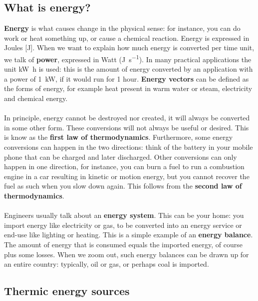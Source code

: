 \documentclass[../summary.tex]{subfiles}
\begin{document}
\subsection{What is energy?}

\textbf{Energy} is what causes change in the physical sense: for instance, you can do work or heat something up, or cause a chemical reaction. Energy is expressed in Joules [\unit{\joule}]. When we want to explain how much energy is converted per time unit, we talk of \textbf{power}, expressed in Watt (\unit{\joule\per\second}). In many practical applications the unit \unit{\kilo\watt\hour} is used: this is the amount of energy converted by an application with a power of \SI{1}{\kilo\watt}, if it would run for 1 hour. \textbf{Energy vectors} can be defined as the forms of energy, for example heat present in warm water or steam, electricity and chemical energy.
\\\\
In principle, energy cannot be destroyed nor created, it will always be converted in some other form. These conversions will not always be useful or desired. This is know as the \textbf{first law of thermodynamics}. Furthermore, some energy conversions can happen in the two directions: think of the battery in your mobile phone that can be charged and later discharged. Other conversions can only happen in one direction, for instance, you can burn a fuel to run a combustion engine in a car resulting in kinetic or motion energy, but you cannot recover the fuel as such when you slow down again. This follows from the \textbf{second law of thermodynamics}.
\\\\
Engineers usually talk about an \textbf{energy system}. This can be your home: you import energy like electricity or gas, to be converted into an energy service or end-use like lighting or heating. This is a simple example of an \textbf{energy balance}. The amount of energy that is consumed equals the imported energy, of course plus some losses. When we zoom out, such energy balances can be drawn up for an entire country: typically, oil or gas, or perhaps coal is imported.

\subsection{Thermic energy sources}
\end{document}
